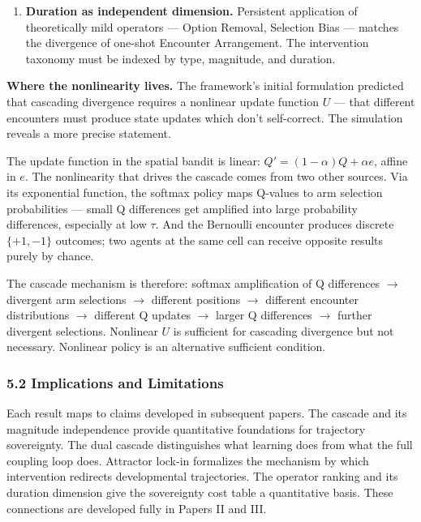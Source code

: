 \documentclass[
]{article}
\providecommand{\tightlist}{%
  \setlength{\itemsep}{0pt}\setlength{\parskip}{0pt}}
\begin{document}
\begin{enumerate}
\def\labelenumi{\arabic{enumi}.}
\setcounter{enumi}{4}
\tightlist
\item
  \textbf{Duration as independent dimension.} Persistent application of
  theoretically mild operators --- Option Removal, Selection Bias ---
  matches the divergence of one-shot Encounter Arrangement. The
  intervention taxonomy must be indexed by type, magnitude, and
  duration.
\end{enumerate}

\textbf{Where the nonlinearity lives.} The framework's initial
formulation predicted that cascading divergence requires a nonlinear
update function \(U\) --- that different encounters must produce state
updates which don't self-correct. The simulation reveals a more precise
statement.

The update function in the spatial bandit is linear:
\(Q' = (1 - \alpha)Q + \alpha e\), affine in \(e\). The nonlinearity
that drives the cascade comes from two other sources. Via its
exponential function, the softmax policy maps Q-values to arm selection
probabilities --- small Q differences get amplified into large
probability differences, especially at low \(\tau\). And the Bernoulli
encounter produces discrete \(\{+1, -1\}\) outcomes; two agents at the
same cell can receive opposite results purely by chance.

The cascade mechanism is therefore: softmax amplification of Q
differences \(\to\) divergent arm selections \(\to\) different positions
\(\to\) different encounter distributions \(\to\) different Q updates
\(\to\) larger Q differences \(\to\) further divergent selections.
Nonlinear \(U\) is sufficient for cascading divergence but not
necessary. Nonlinear policy is an alternative sufficient condition.

\subsubsection{5.2 Implications and
Limitations}\label{implications-and-limitations}

Each result maps to claims developed in subsequent papers. The cascade
and its magnitude independence provide quantitative foundations for
trajectory sovereignty. The dual cascade distinguishes what learning
does from what the full coupling loop does. Attractor lock-in formalizes
the mechanism by which intervention redirects developmental
trajectories. The operator ranking and its duration dimension give the
sovereignty cost table a quantitative basis. These connections are
developed fully in Papers II and III.
\end{document}
